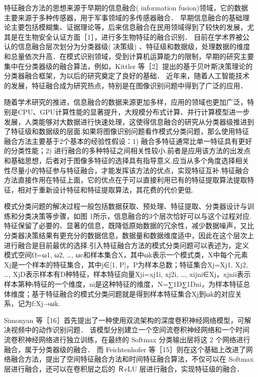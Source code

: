 特征融合方法的思想来源于早期的信息融合( information fusion)领域，它的数据主要来源于多种传感器，用于军事领域的多传感器融合． 早期信息融合的基础理论主要包括模糊集、证据理论等，后来信息融合在民用领域得到了较快的发展，尤其是在生物安全认证方面［1］，进行多生物特征的融合识别． 目前在学术界被公认的信息融合层次划分为分类器级( 决策级) 、特征级和数据级，处理数据的维度和总量依次升高．在模式识别领域，受到计算机运算能力的限制，早期的研究主要集中在分类器级的融合算法，例如，Kittler
等［2］提出的基于贝叶斯决策理论的分类器融合框架，为以后的研究奠定了良好的基础． 近年来，随着人工智能技术的发展，特征融合成为研究热点，特别是在图像识别问题中得到了广泛的应用．

随着学术研究的推进，信息融合的数据来源更加多样，应用的领域也更加广泛，特别是CPU、GPU计算性能的显著提升，大规模分布式计算、并行计算模型进一步发展，人类能够对大数据进行快速处理，这使得信息融合的研究从分类器级推进到了特征级和数据级的层面.如果将图像识别问题看作模式分类问题，那么使用特征融合方法主要基于2个基本的经验性假设：1) 融合多特征通常比单一特征具有更好的分类性能；2) 进行融合的多种特征之间相关性较小.前者是应用该方法的出发点和基础思想，后者对于图像多特征的选择具有指导意义.应当从多个角度选择相关性尽量小的特征参与特征融合，才能发挥该方法的优点，实现特征互补.特征融合方法直接作用在特征上面，它的优点在于可以直接利用已有的特征提取算法提取特征，相对于重新设计特征和特征提取算法，其花费的代价更低.

模式分类问题的解决过程一般包括数据获取、预处理、特征提取、分类器设计与训练和分类决策等步骤，如图 1所示，信息融合的3个层次恰好可以与这个过程对应.特征保留了必要的、显著的信息，既降低原始数据的冗余性，减少数据噪声，又比分类器决策结果有更充分的数据信息，数据量和数据维度适中，因此在这个层次上进行融合是目前最优的选择.引入特征融合方法的模式分类问题可以表述为，定义模式空间Ω={ω1, ω2, …, ωc}和样本集合X，其中ωk表示一个模式类，X中每个元素Xj是一个样本的特征集合，其中j∈[1, P]，P为样本总数；特征集合Xj={Xj1, Xj2, …, XjD}表示样本有D种特征，样本特征向量Xji={xj1i, xj2i, …, xijni}∈Xj，xjnii表示样本第种i特征的一个维度，ni是这种特征的维度，N=∑1D∑1Dni，为样本特征总体维度；基于特征融合的模式分类问题就是得到样本特征集合Xj到ωk的对应关系，记为f:Xj→ωk.

Simonyan 等［16］首先提出了一种使用双流架构的深度卷积神经网络模型，可解决视频中的动作识别问题． 该模型分别建立一个空间流卷积神经网络和一个时间流卷积神经网络进行独立训练，在最终的 Softmax 分类输出层将这 2 个网络进行融合，属于分类器级的融合． 而 Feichtenhofer 等［15］则在这个基础上改进了网络融合方法，提出了空间特征融合方法和时间特征融合算法，不仅可以在 Softmax 层进行融合，还可以在卷积层之后的 ＲeLU 层进行融合，实现特征级的融合．

